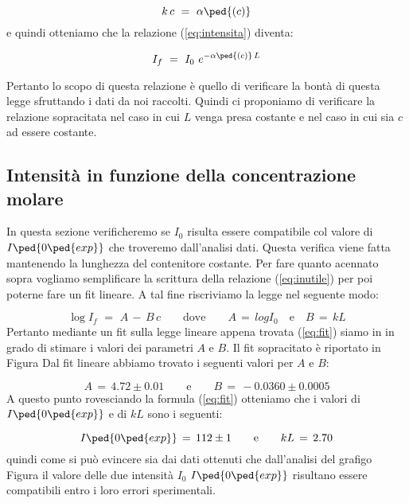 \begin{equation}
	k\,c \,\,=\,\, \alpha\ped{(c)}
\end{equation}
%
e quindi otteniamo che la relazione (\ref{eq:intensita}) diventa:

\begin{equation}
	I_f \,\,=\,\, I_0 \,\, e^{-\alpha\ped{(c)}\,L}
	\label{eq:inutile}
\end{equation}
%

Pertanto lo scopo di questa relazione è quello di verificare la bontà di questa legge sfruttando i dati da noi raccolti.
Quindi ci proponiamo di verificare la relazione sopracitata nel caso in cui $L$ venga presa costante e nel caso in cui sia $c$ ad essere costante.

\subsection{Intensità in funzione della concentrazione molare}

In questa sezione verificheremo se $I_0$ risulta essere compatibile col valore di $I\ped{0\ped{exp}}$ che troveremo dall'analisi dati. Questa verifica viene fatta mantenendo la lunghezza del contenitore costante.
Per fare quanto acennato sopra vogliamo semplificare la scrittura della relazione (\ref{eq:inutile}) per poi poterne fare un fit lineare. A tal fine riscriviamo la legge nel seguente modo:

\begin{equation}
	\log{I_f} \,\,=\,\, A \,-\, B \, c \qquad \text{dove} \qquad A \,=\, log{I_0} \quad \text{e} \quad B\,=\, kL
	\label{eq:fit}
\end{equation}
%
Pertanto mediante un fit sulla legge lineare appena trovata (\ref{eq:fit}) siamo in in grado di stimare i valori dei parametri
$A$ e $B$. Il fit sopracitato è riportato in Figura %
Dal fit lineare abbiamo trovato i seguenti valori per $A$ e $B$:

\begin{equation*}
	A \,=\, 4.72 \pm 0.01 \qquad \text{e} \qquad B \,=\, -0.0360 \pm 0.0005
\end{equation*}
%
A questo punto rovesciando la formula (\ref{eq:fit}) otteniamo che i valori di $I\ped{0\ped{exp}}$ e di $kL$ sono i seguenti:

\begin{equation}
	I\ped{0\ped{exp}} \,=\, 112 \pm 1 \qquad \text{e} \qquad kL \,=\, 2.70
\end{equation}
%
quindi come si può evincere sia dai dati ottenuti che dall'analisi del grafigo Figura %
il valore delle due intensità $I_0$ $I\ped{0\ped{exp}}$  risultano essere compatibili entro i loro errori sperimentali.


